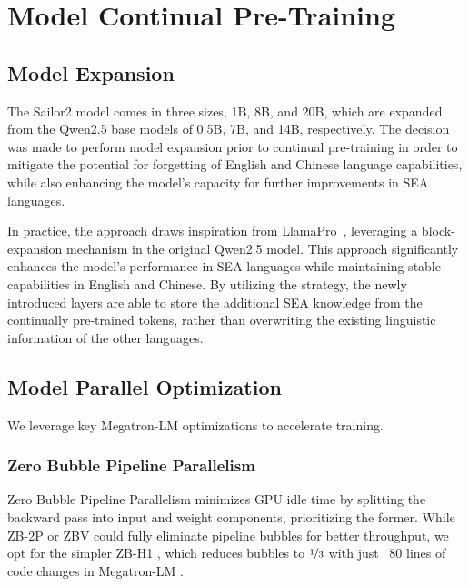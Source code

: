 \section{Model Continual Pre-Training}

\subsection{Model Expansion}

The Sailor2 model comes in three sizes, 1B, 8B, and 20B, which are expanded from the Qwen2.5 base models of 0.5B, 7B, and 14B, respectively. The decision was made to perform model expansion prior to continual pre-training in order to mitigate the potential for forgetting of English and Chinese language capabilities, while also enhancing the model’s capacity for further improvements in SEA languages.

In practice, the approach draws inspiration from LlamaPro~\citep{wu2024llama}, leveraging a block-expansion mechanism in the original Qwen2.5 model. This approach significantly enhances the model’s performance in SEA languages while maintaining stable capabilities in English and Chinese. By utilizing the strategy, the newly introduced layers are able to store the additional SEA knowledge from the continually pre-trained tokens, rather than overwriting the existing linguistic information of the other languages.



\subsection{Model Parallel Optimization}
We leverage key Megatron-LM optimizations \citep{narayanan2021megatron} to accelerate training.


\subsubsection{Zero Bubble Pipeline Parallelism} 

Zero Bubble Pipeline Parallelism \citep{qi2023zerobubble} minimizes GPU idle time by splitting the backward pass into input and weight components, prioritizing the former. While ZB-2P or ZBV \citep{qi2024pipeline} could fully eliminate pipeline bubbles for better throughput, we opt for the simpler ZB-H1 \citep{qi2023zerobubble}, which reduces bubbles to $\nicefrac{1}{3}$ with just ~80 lines of code changes in Megatron-LM \citep{narayanan2021megatron}.


